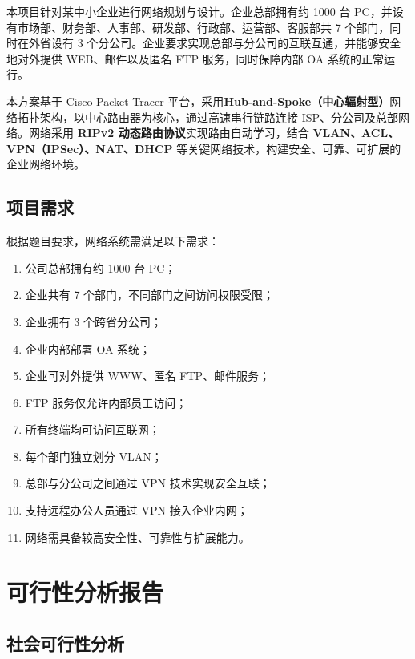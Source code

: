 \documentclass[12pt,a4paper]{ctexart}
\begin{document}
本项目针对某中小企业进行网络规划与设计。企业总部拥有约 1000 台 PC，并设有市场部、财务部、人事部、研发部、行政部、运营部、客服部共 7 个部门，同时在外省设有 3 个分公司。企业要求实现总部与分公司的互联互通，并能够安全地对外提供 WEB、邮件以及匿名 FTP 服务，同时保障内部 OA 系统的正常运行。

本方案基于 Cisco Packet Tracer 平台，采用\textbf{Hub-and-Spoke（中心辐射型）}网络拓扑架构，以中心路由器为核心，通过高速串行链路连接 ISP、分公司及总部网络。网络采用 \textbf{RIPv2 动态路由协议}实现路由自动学习，结合 \textbf{VLAN、ACL、VPN（IPSec）、NAT、DHCP} 等关键网络技术，构建安全、可靠、可扩展的企业网络环境。

\subsection{项目需求}

根据题目要求，网络系统需满足以下需求：

\begin{enumerate}[label=(\arabic*), leftmargin=2em]
    \item 公司总部拥有约 1000 台 PC；
    \item 企业共有 7 个部门，不同部门之间访问权限受限；
    \item 企业拥有 3 个跨省分公司；
    \item 企业内部部署 OA 系统；
    \item 企业可对外提供 WWW、匿名 FTP、邮件服务；
    \item FTP 服务仅允许内部员工访问；
    \item 所有终端均可访问互联网；
    \item 每个部门独立划分 VLAN；
    \item 总部与分公司之间通过 VPN 技术实现安全互联；
    \item 支持远程办公人员通过 VPN 接入企业内网；
    \item 网络需具备较高安全性、可靠性与扩展能力。
\end{enumerate}

\section{可行性分析报告}

\subsection{社会可行性分析}
\end{document}
